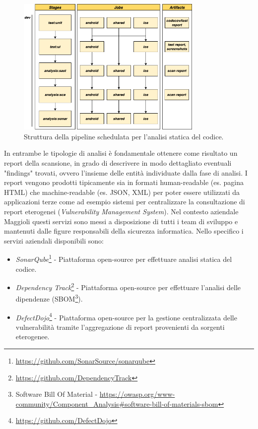 \begin{figure}[H]
\centering
\includegraphics[width=0.8\textwidth]{img/tesi-16-cicd-scheduled.drawio.png}
\caption{Struttura della pipeline schedulata per l'analisi statica del codice.}
\end{figure}

In entrambe le tipologie di analisi è fondamentale ottenere come risultato un report della scansione, in grado di descrivere in modo dettagliato eventuali "findings" trovati, ovvero l'insieme delle entità individuate dalla fase di analisi. I report vengono prodotti tipicamente sia in formati human-readable (es. pagina HTML) che machine-readable (es. JSON, XML) per poter essere utilizzati da applicazioni terze come ad esempio sistemi per centralizzare la consultazione di report eterogenei (\textit{Vulnerability Management System}). Nel contesto aziendale Maggioli questi servizi sono messi a disposizione di tutti i team di sviluppo e mantenuti dalle figure responsabili della sicurezza informatica. Nello specifico i servizi aziendali disponibili sono:
\begin{itemize}
    \item \textit{SonarQube}\footnote{\url{https://github.com/SonarSource/sonarqube}} - Piattaforma open-source per effettuare analisi statica del codice.
    \item \textit{Dependency Track}\footnote{\url{https://github.com/DependencyTrack}} - Piattaforma open-source per effettuare l'analisi delle dipendenze (SBOM\footnote{Software Bill Of Material - \url{https://owasp.org/www-community/Component_Analysis\#software-bill-of-materials-sbom}}).
    \item \textit{DefectDojo}\footnote{\url{https://github.com/DefectDojo}} - Piattaforma open-source per la gestione centralizzata delle vulnerabilità tramite l'aggregazione di report provenienti da sorgenti eterogenee.
\end{itemize}

